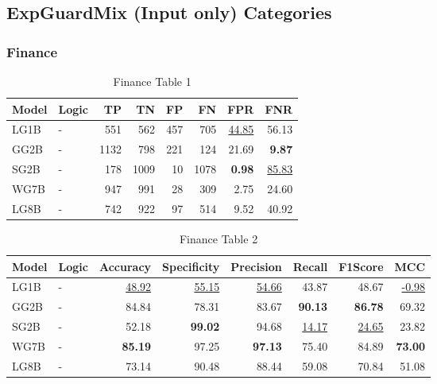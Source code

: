 \documentclass{article}
\begin{document}

\subsection{ExpGuardMix (Input only) Categories}

\subsubsection{Finance}

\begin{table}[H]
\centering
\begin{tabular}{llrrrrrr}
\toprule
 Model          & Logic   &   TP &   TN &   FP &   FN &   FPR &   FNR \\
\midrule

 LG1B    & -       &  551 &  562 &  457 &  705 & \underline{44.85} & 56.13             \\
 GG2B    & -       & 1132 &  798 &  221 &  124 & 21.69             & \textbf{9.87}     \\
 SG2B    & -       &  178 & 1009 &   10 & 1078 & \textbf{0.98}     & \underline{85.83} \\
 WG7B    & -       &  947 &  991 &   28 &  309 & 2.75              & 24.60             \\
 LG8B    & -       &  742 &  922 &   97 &  514 & 9.52              & 40.92             \\

\bottomrule
\end{tabular}
\caption{\label{tab:widgets}Finance Table 1}
\end{table}

\begin{table}[H]
\begin{tabular}{llrrrrrr}
\toprule
 Model          & Logic   &   Accuracy &   Specificity &   Precision &   Recall &   F1Score &      MCC \\
\midrule

 LG1B    & -       & \underline{48.92} & \underline{55.15} & \underline{54.66} & 43.87             & 48.67             & \underline{-0.98} \\
 GG2B    & -       & 84.84             & 78.31             & 83.67             & \textbf{90.13}    & \textbf{86.78}    & 69.32             \\
 SG2B    & -       & 52.18             & \textbf{99.02}    & 94.68             & \underline{14.17} & \underline{24.65} & 23.82             \\
 WG7B    & -       & \textbf{85.19}    & 97.25             & \textbf{97.13}    & 75.40             & 84.89             & \textbf{73.00}    \\
 LG8B    & -       & 73.14             & 90.48             & 88.44             & 59.08             & 70.84             & 51.08             \\

\bottomrule
\end{tabular}
\caption{\label{tab:xstest2}Finance Table 2}
\end{table}
\end{document}
